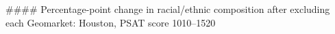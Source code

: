 #### Percentage-point change in racial/ethnic composition after excluding each Geomarket: Houston, PSAT score 1010–1520
